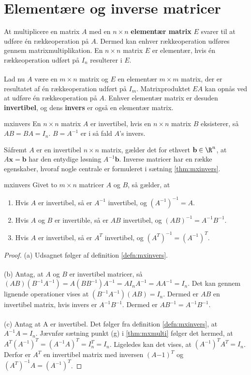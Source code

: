 \section{Elementære og inverse matricer}
At multiplicere en matrix $A$ med en $n \times n$ \textbf{elementær matrix} $E$ svarer til at udføre én rækkeoperation på $A$. 
Dermed kan enhver rækkeoperation udføres gennem matrixmultiplikation. 
En $n \times n$ matrix $E$ er elementær, hvis én rækkeoperation udført på $I_n$ resulterer i $E$. 
\\\\
Lad nu $A$ være en $m \times n$ matrix og $E$ en elementær $m \times m$ matrix, der er resultatet af én rækkeoperation udført på $I_m$. 
Matrixproduktet $EA$ kan opnås ved at udføre én rækkeoperation på $A$. 
Enhver elementær matrix er desuden \textbf{invertibel}, og dens \textbf{invers} er også en elementær matrix. 
%
\begin{defn}{}{mxinvers}
En $n \times n$ matrix $A$ er invertibel, hvis en $n \times n$ matrix $B$ eksisterer, så $AB=BA=I_n$. $B=A^{-1}$ er i så fald $A$'s invers. 
\end{defn}
\noindent
Såfremt $A$ er en invertibel $n \times n$ matrix, gælder det for ethvert $\mathbf{b} \in \R^n$, at $A\textbf{x}=\mathbf{b}$ har den entydige løsning $A^{-1}\mathbf{b}$. 
%
Inverse matricer har en række egenskaber, hvoraf nogle centrale er formuleret i sætning \ref{thm:mxinvers}. 
%
\begin{thm}{}{mxinvers}
Givet to $m \times n$ matricer $A$ og $B$, så gælder, at
\begin{enumerate}[label=(\alph*)]
\item Hvis $A$ er invertibel, så er $A^{-1}$ invertibel, og $(A^{-1})^{-1}=A$.
\item Hvis $A$ og $B$ er invertible, så er $AB$ invertibel, og $(AB)^{-1}=A^{-1}B^{-1}$.
\item Hvis $A$ er invertibel, så er $A^T$ invertibel, og $(A^T)^{-1}=(A^{-1})^T$.
\end{enumerate}
\end{thm}
%
%
\begin{proof}
(a)
Udsagnet følger af definition \ref{defn:mxinvers}. 
\\\\
(b) Antag, at $A$ og $B$ er invertibel matricer, så $(AB)(B^{-1}A^{-1})=A(BB^{-1})A^{-1}=AI_nA^{-1}=AA^{-1}=I_n$. 
Det kan gennem lignende operationer vises at $(B^{-1}A^{-1})(AB)=I_n$.
Dermed er $AB$ en invertibel matrix, hvis invers er $A^{-1}B^{-1}$.
Dermed er $AB^{-1}=A^{-1}B^{-1}$.
\\\\
(c) Antag at A er invertibel. 
Det følger fra definition \ref{defn:mxinvers}, at $A^{-1}A=I_n$. 
Jævnfør sætning punkt (g) i  \ref{thm:mxmulti} følger det hermed, at $A^T(A^{-1})^T=(A^{-1}A)^T=I_n^T=I_n$. 
Ligeledes kan det vises, at $(A^{-1})^TA^T=I_n$. 
Derfor er $A^T$ en invertibel matrix med inversen $(A{-1})^T$ og $(A^T)^{-1}A=(A^{-1})^T$.
\end{proof}
